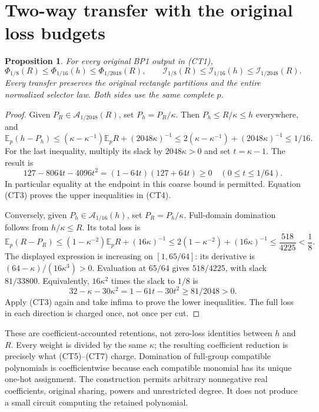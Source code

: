 \documentclass[11pt]{article}
\newtheorem{proposition}{Proposition}
\newcommand{\E}{\mathbb E}
\begin{document}
\section{Two-way transfer with the original loss budgets}
\begin{proposition}
For every original BP1 output in (CT1),
\[
 \Phi_{1/8}(R)\le\Phi_{1/16}(h)\le\Phi_{1/2048}(R),
 \qquad
 \mathcal I_{1/8}(R)\le\mathcal I_{1/16}(h)
                         \le\mathcal I_{1/2048}(R).    \tag{CT4}
\]
Every transfer preserves the original rectangle partitions and the
entire normalized selector law. Both sides use the same complete $p$.
\end{proposition}
\begin{proof}
Given $P_R\in\mathcal A_{1/2048}(R)$, set $P_h=P_R/\kappa$.
Then $P_h\le R/\kappa\le h$ everywhere, and
\[
 \E_p(h-P_h)
 \le(\kappa-\kappa^{-1})\E_pR+(2048\kappa)^{-1}
 \le2(\kappa-\kappa^{-1})+(2048\kappa)^{-1}
 \le1/16 .                                           \tag{CT5}
\]
For the last inequality, multiply its slack by $2048\kappa>0$
and set $t=\kappa-1$. The result is
\[
 127-8064t-4096t^2=(1-64t)(127+64t)\ge0
                  \quad(0\le t\le1/64).              \tag{CT6}
\]
In particular equality at the endpoint in this coarse bound is
permitted. Equation (CT3) proves the upper inequalities in (CT4).

Conversely, given $P_h\in\mathcal A_{1/16}(h)$, set $P_R=P_h/\kappa$.
Full-domain domination follows from $h/\kappa\le R$. Its total loss is
\[
 \E_p(R-P_R)
 \le(1-\kappa^{-2})\E_pR+(16\kappa)^{-1}
 \le2(1-\kappa^{-2})+(16\kappa)^{-1}
 \le\frac{518}{4225}<\frac18.                        \tag{CT7}
\]
The displayed expression is increasing on $[1,65/64]$:
its derivative is $(64-\kappa)/(16\kappa^3)>0$.
Evaluation at $65/64$ gives $518/4225$, with slack $81/33800$.
Equivalently, $16\kappa^2$ times the slack to $1/8$ is
\[
 32-\kappa-30\kappa^2=1-61t-30t^2
                    \ge81/2048>0.                 \tag{CT8}
\]
Apply (CT3) again and take infima to prove the lower inequalities.
The full loss in each direction is charged once, not once per cut.
\end{proof}

These are coefficient-accounted retentions, not zero-loss identities
between $h$ and $R$. Every weight is divided by the same $\kappa$;
the resulting coefficient reduction is precisely what (CT5)--(CT7)
charge. Domination of full-group compatible polynomials is
coefficientwise because each compatible monomial has its unique
one-hot assignment. The construction permits arbitrary nonnegative
real coefficients, original sharing, powers and unrestricted degree.
It does not produce a small circuit computing the retained polynomial.
\end{document}
